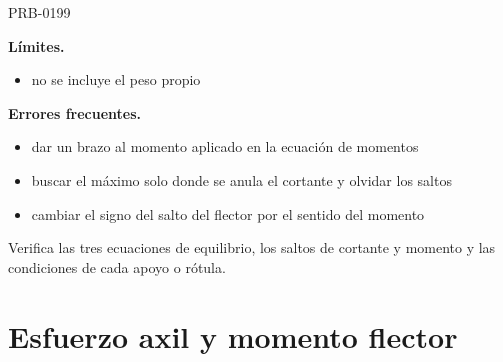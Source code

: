 \begin{studiumworked}{PRB-0199}
\par\noindent\begin{minipage}{\linewidth}

\textbf{Límites.}\begin{itemize}\item no se incluye el peso propio\end{itemize}

\textbf{Errores frecuentes.}\begin{itemize}\item dar un brazo al momento aplicado en la ecuación de momentos
\item buscar el máximo solo donde se anula el cortante y olvidar los saltos
\item cambiar el signo del salto del flector por el sentido del momento\end{itemize}

\begin{tcolorbox}[studiumcheck,breakable=false,title={Síntesis y comprobación}]Verifica las tres ecuaciones de equilibrio, los saltos de cortante y momento y las condiciones de cada apoyo o rótula.\end{tcolorbox}

\end{minipage}

\end{studiumworked}

\chapter{Esfuerzo axil y momento flector}


\Needspace{.3\textheight}

